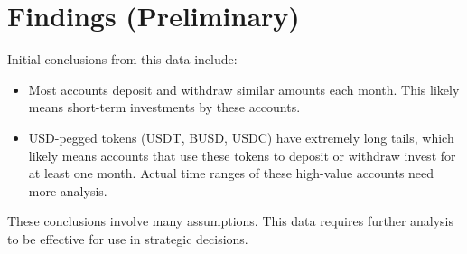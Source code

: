 \documentclass[12pt]{article}
\begin{document}
    \section*{Findings (Preliminary)}
        Initial conclusions from this data include:
        \begin{itemize}{}{}
            \item Most accounts deposit and withdraw similar amounts each month. This likely means short-term investments by these accounts.
            \item USD-pegged tokens (USDT, BUSD, USDC) have extremely long tails, which likely means accounts that use these tokens to deposit or withdraw invest for at least one month. Actual time ranges of these high-value accounts need more analysis.
        \end{itemize}

        These conclusions involve many assumptions. This data requires further analysis to be effective for use in strategic decisions.
\end{document}
